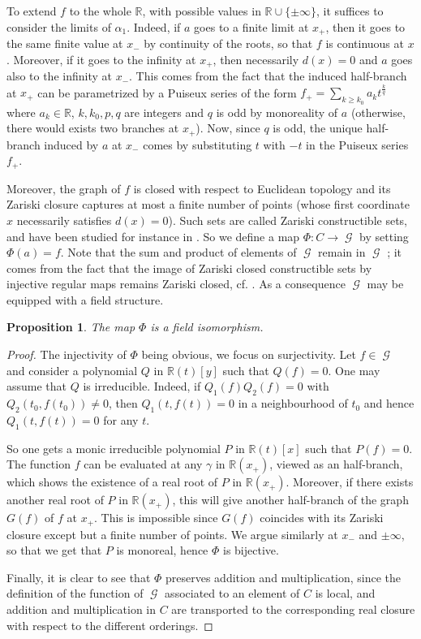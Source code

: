 \documentclass[12pt]{amsart}
\newtheorem{prop}[thm]{Proposition}
\theoremstyle{definition}
\def \RR {{\mathbb R}}
\DeclareMathOperator{\GM}{\mathcal{G}}
\begin{document}
To extend $f$ to the whole $\RR$, with possible values in $\RR\cup\{\pm\infty\}$, it suffices to consider the limits of $\alpha_1$. 
Indeed, if $a$ goes to a finite limit at $x_+$, then it  goes to the same finite value at $x_-$ by continuity of the roots, so that $f$ is continuous at $x$. Moreover, if it goes to the infinity at $x_+$, then necessarily $d(x)=0$ and 
$a$ goes also to the infinity at $x_-$. 
This comes from the fact that the induced half-branch at $x_+$ can be parametrized by a Puiseux series of the form $f_+=\sum_{k\geq k_0}a_kt^{\frac{k}{q}}$ where $a_k\in \RR$, $k,k_0,p,q$ are integers and $q$ is odd by monoreality of $a$ (otherwise, there would exists two branches at $x_+$). Now, since $q$ is odd, the unique half-branch induced by $a$ at $x_-$ comes by substituting $t$ with $-t$ in the Puiseux series $f_+$.   

Moreover, the graph of $f$ is closed with respect to Euclidean topology and its Zariski closure captures at most a finite number of points (whose first coordinate $x$ necessarily satisfies $d(x)=0$). Such sets are called Zariski constructible sets, and have been studied for instance in \cite{P}.
So we define a map $\Phi : C\to \GM$ by setting $\Phi(a)=f$. Note that the sum and product of elements of $\GM$ remain in $\GM$ ; it comes from the fact that the image of Zariski closed constructible sets by injective regular maps remains Zariski closed, cf. \cite{P}. As a consequence $\GM$ may be equipped with a field structure.

\begin{prop}
	The map $\Phi$ is a field isomorphism.
\end{prop}	
\begin{proof}
	The injectivity of $\Phi$ being obvious, we focus on  surjectivity.
	Let $f\in\GM$ and consider a polynomial $Q$ in 
	$\RR(t)[y]$ such that $Q(f)=0$. One may assume that $Q$ is irreducible. Indeed, if $Q_1(f)Q_2(f)=0$ with $Q_2(t_0,f(t_0))\not=0$, then 
	$Q_1(t,f(t))=0$ in a neighbourhood of
	$t_0$ and hence $Q_1(t,f(t))=0$ for any $t$.
	
	So one gets a monic irreducible polynomial $P$ in $\RR(t)[x]$ such that $P(f)=0$.
	The function $f$ can be evaluated at any $\gamma$ in $\RR(x_+)$, viewed as an half-branch, which shows the existence of a real root of $P$ in $\RR(x_+)$. 
	Moreover, if there exists another real root of $P$ in $\RR(x_+)$, this will give another half-branch of the graph $G(f)$ of $f$ at $x_+$. This is impossible since $G(f)$ coincides with its Zariski closure except but a finite number of points.
	We argue similarly at $x_-$ and $\pm \infty$, so that we get that $P$ is monoreal, hence $\Phi$ is bijective.
	
	
	Finally, it is clear to see that $\Phi$ preserves addition and multiplication, since the definition of the function of $\GM$ associated to an element of $C$ is local, and addition and multiplication in $C$ are transported to the corresponding real closure with respect to the different orderings. 
\end{proof}	
\end{document}

